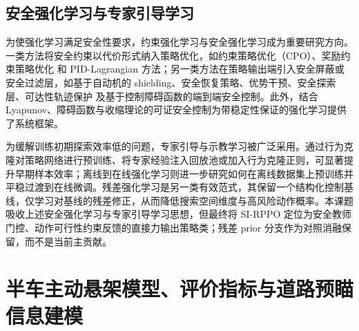 \subsection{安全强化学习与专家引导学习}
为使强化学习满足安全性要求，约束强化学习与安全强化学习成为重要研究方向。一类方法将安全约束以代价形式纳入策略优化，如约束策略优化（CPO）\cite{achiam2017constrained}、奖励约束策略优化\cite{tessler2019reward} 和 PID-Lagrangian 方法\cite{stooke2020responsive,ma2021feasible}；另一类方法在策略输出端引入安全屏蔽或安全过滤层，如基于自动机的 shielding\cite{alshiekh2018safe}、安全恢复策略\cite{thananjeyan2021recovery}、优势干预\cite{wagener2021safe}、安全探索层\cite{dalal2018safe}、可达性轨迹保护\cite{shao2021reachability} 及基于控制障碍函数的端到端安全控制\cite{cheng2019end,hunt2021verifiably}。此外，结合 Lyapunov、障碍函数与收缩理论的可证安全控制为带稳定性保证的强化学习提供了系统框架\cite{brunke2022safe,dawson2023safe,sikchi2021lyapunov,han2020actor,han2021rlcontrol}。

为缓解训练初期探索效率低的问题，专家引导与示教学习被广泛采用。通过行为克隆对策略网络进行预训练、将专家经验注入回放池或加入行为克隆正则，可显著提升早期样本效率\cite{rajeswaran2018learning,nair2018overcoming,zhang2018pretraining,andrychowicz2017hindsight}；离线到在线强化学习则进一步研究如何在离线数据集上预训练并平稳过渡到在线微调\cite{nair2020awac,kostrikov2022offline,nakamoto2023calql,uchendu2023jumpstart}。残差强化学习是另一类有效范式，其保留一个结构化控制基线，仅学习对基线的残差修正，从而降低搜索空间维度与高风险动作概率\cite{johannink2019residual,silver2018residual,rana2023bayesian}。本课题吸收上述安全强化学习与专家引导学习思想，但最终将 SI-RPPO 定位为安全教师门控、动作可行性约束反馈的直接力输出策略类；残差 prior 分支作为对照消融保留，而不是当前主贡献。

\section{半车主动悬架模型、评价指标与道路预瞄信息建模}

